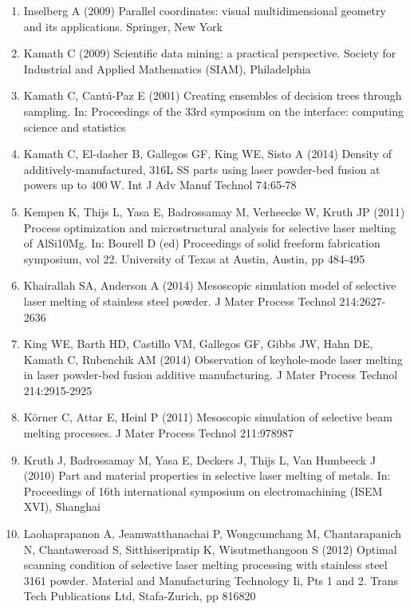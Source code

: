 \documentclass[10pt]{article}
\begin{document}
\begin{enumerate}
  \item Inselberg A (2009) Parallel coordinates: visual multidimensional geometry and its applications. Springer, New York

  \item Kamath C (2009) Scientific data mining: a practical perspective. Society for Industrial and Applied Mathematics (SIAM), Philadelphia

  \item Kamath C, Cantú-Paz E (2001) Creating ensembles of decision trees through sampling. In: Proceedings of the 33rd symposium on the interface: computing science and statistics

  \item Kamath C, El-dasher B, Gallegos GF, King WE, Sisto A (2014) Density of additively-manufactured, 316L SS parts using laser powder-bed fusion at powers up to $400 \mathrm{~W}$. Int J Adv Manuf Technol 74:65-78

  \item Kempen K, Thijs L, Yasa E, Badrossamay M, Verheecke W, Kruth JP (2011) Process optimization and microstructural analysis for selective laser melting of AlSi10Mg. In: Bourell D (ed) Proceedings of solid freeform fabrication symposium, vol 22. University of Texas at Austin, Austin, pp 484-495

  \item Khairallah SA, Anderson A (2014) Mesoscopic simulation model of selective laser melting of stainless steel powder. J Mater Process Technol 214:2627-2636

  \item King WE, Barth HD, Castillo VM, Gallegos GF, Gibbs JW, Hahn DE, Kamath C, Rubenchik AM (2014) Observation of keyhole-mode laser melting in laser powder-bed fusion additive manufacturing. J Mater Process Technol 214:2915-2925

  \item Körner C, Attar E, Heinl P (2011) Mesoscopic simulation of selective beam melting processes. J Mater Process Technol 211:978987

  \item Kruth J, Badrossamay M, Yasa E, Deckers J, Thijs L, Van Humbeeck J (2010) Part and material properties in selective laser melting of metals. In: Proceedings of 16th international symposium on electromachining (ISEM XVI), Shanghai

  \item Laohaprapanon A, Jeamwatthanachai P, Wongcumchang M, Chantarapanich N, Chantaweroad S, Sitthiseripratip K, Wisutmethangoon S (2012) Optimal scanning condition of selective laser melting processing with stainless steel 3161 powder. Material and Manufacturing Technology Ii, Pts 1 and 2. Trans Tech Publications Ltd, Stafa-Zurich, pp 816820


\end{enumerate}
\end{document}
